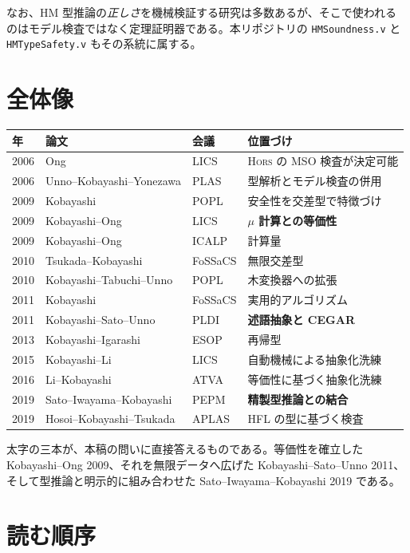 \documentclass[11pt,a4paper]{ltjsarticle}
\newcommand{\HORS}{\textsc{Hors}}
\begin{document}
なお、HM 型推論の\emph{正しさ}を機械検証する研究は多数あるが、そこで使われる
のはモデル検査ではなく定理証明器である。本リポジトリの
\texttt{HMSoundness.v} と \texttt{HMTypeSafety.v} もその系統に属する。

\section{全体像}

\begin{center}
\begin{tabular}{llll}
  年 & 論文 & 会議 & 位置づけ \\
  \hline
  2006 & Ong & LICS & \HORS{} の MSO 検査が決定可能 \\
  2006 & Unno--Kobayashi--Yonezawa & PLAS & 型解析とモデル検査の併用 \\
  2009 & Kobayashi & POPL & 安全性を交差型で特徴づけ \\
  2009 & Kobayashi--Ong & LICS & \textbf{$\mu$ 計算との等価性} \\
  2009 & Kobayashi--Ong & ICALP & 計算量 \\
  2010 & Tsukada--Kobayashi & FoSSaCS & 無限交差型 \\
  2010 & Kobayashi--Tabuchi--Unno & POPL & 木変換器への拡張 \\
  2011 & Kobayashi & FoSSaCS & 実用的アルゴリズム \\
  2011 & Kobayashi--Sato--Unno & PLDI & \textbf{述語抽象と CEGAR} \\
  2013 & Kobayashi--Igarashi & ESOP & 再帰型 \\
  2015 & Kobayashi--Li & LICS & 自動機械による抽象化洗練 \\
  2016 & Li--Kobayashi & ATVA & 等価性に基づく抽象化洗練 \\
  2019 & Sato--Iwayama--Kobayashi & PEPM & \textbf{精製型推論との結合} \\
  2019 & Hosoi--Kobayashi--Tsukada & APLAS & HFL の型に基づく検査 \\
\end{tabular}
\end{center}

太字の三本が、本稿の問いに直接答えるものである。等価性を確立した
Kobayashi--Ong 2009、それを無限データへ広げた Kobayashi--Sato--Unno 2011、
そして型推論と明示的に組み合わせた Sato--Iwayama--Kobayashi 2019 である。

\section{読む順序}
\end{document}
